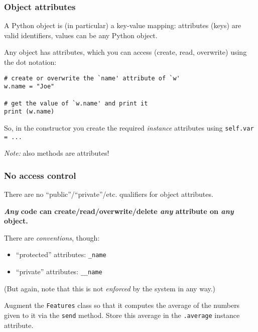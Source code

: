 \documentclass[english,serif,mathserif,xcolor=pdftex,dvipsnames,table]{beamer}
\begin{document}
\begin{frame}[fragile]
  \frametitle{Object attributes}

  A Python object is (in particular) a key-value mapping: attributes
  (keys) are valid identifiers, values can be any Python object.

  \+
  Any object has attributes, which you can access (create, read,
  overwrite) using the dot notation:
\begin{lstlisting}
# create or overwrite the `name' attribute of `w'
w.name = "Joe"

# get the value of `w.name' and print it
print (w.name)
\end{lstlisting}

  \+ 
  So, in the constructor you create the required \emph{instance}
  attributes using \lstinline|self.var = ...|

  \+
  \emph{Note:} also methods are attributes!
\end{frame}


\begin{frame}
  \frametitle{No access control}
  There are no ``public''/``private''/etc. qualifiers for object
  attributes.

  \+
  \textbf{\emph{Any} code can create/read/overwrite/delete \emph{any} attribute on
    \emph{any} object.}

  \+
  There are \emph{conventions}, though:
  \begin{itemize}
  \item ``protected'' attributes: \texttt{\_name}
  \item ``private'' attributes: \texttt{\_\_name}
  \end{itemize}
  (But again, note that this is not \emph{enforced} by the system in
  any way.)

\end{frame}


\begin{frame}
  \begin{exercise}
    Augment the \texttt{Features} class so that it computes the
    average of the numbers given to it via the \texttt{send} method.
    Store this average in the \texttt{.average} instance attribute.
  \end{exercise}
\end{frame}
\end{document}
